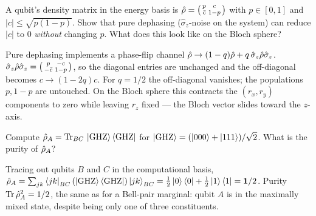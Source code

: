 \begin{exercise}
A qubit's density matrix in the energy basis is
$\hat{\rho}=\bigl(\begin{smallmatrix}p&c\\\bar c&1-p\end{smallmatrix}\bigr)$
with $p\in[0,1]$ and $|c|\leq\sqrt{p(1-p)}$. Show that pure
dephasing ($\hat\sigma_z$-noise on the system) can reduce $|c|$
to $0$ \emph{without} changing $p$. What does this look like on
the Bloch sphere?
\begin{solution}
Pure dephasing implements a phase-flip channel
$\hat{\rho}\to(1-q)\hat{\rho}+q\,\hat\sigma_z\hat{\rho}\hat\sigma_z$.
$\hat\sigma_z\hat{\rho}\hat\sigma_z=\bigl(\begin{smallmatrix}p&-c\\-\bar c&1-p\end{smallmatrix}\bigr)$,
so the diagonal entries are unchanged and the off-diagonal becomes
$c\to(1-2q)c$. For $q=1/2$ the off-diagonal vanishes; the
populations $p,1-p$ are untouched. On the Bloch sphere this
contracts the $(r_x,r_y)$ components to zero while leaving $r_z$
fixed --- the Bloch vector slides toward the $z$-axis.
\end{solution}
\end{exercise}

\begin{exercise}
Compute $\hat{\rho}_A=\operatorname{Tr}_{BC}\,\ket{\text{GHZ}}\bra{\text{GHZ}}$
for $\ket{\text{GHZ}}=(\ket{000}+\ket{111})/\sqrt 2$. What is the
purity of $\hat{\rho}_A$?
\begin{solution}
Tracing out qubits $B$ and $C$ in the computational basis,
$\hat{\rho}_A=\sum_{jk}\bra{jk}_{BC}(\ket{\text{GHZ}}\bra{\text{GHZ}})\ket{jk}_{BC}
=\tfrac12\ket{0}\bra{0}+\tfrac12\ket{1}\bra{1}=\mathbf{1}/2$. Purity
$\operatorname{Tr}\hat{\rho}_A^2=1/2$, the same as for a Bell-pair marginal:
qubit $A$ is in the maximally mixed state, despite being only one
of three constituents.
\end{solution}
\end{exercise}
